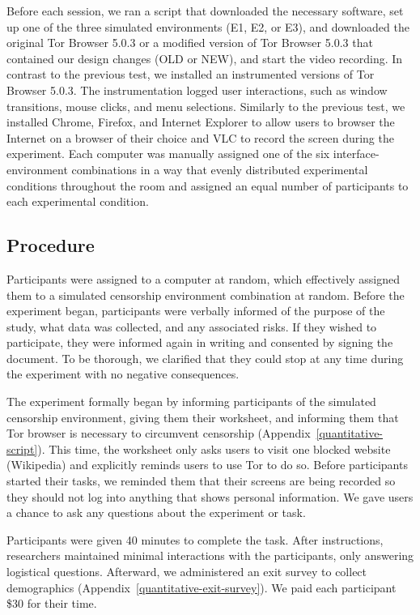 \documentclass[USenglish,oneside,twocolumn]{article}
\begin{document}
Before each session, we ran a script that downloaded the necessary software, set up one of the three simulated environments (E1, E2, or E3), and downloaded the original Tor Browser 5.0.3 or a modified version of Tor Browser 5.0.3 that contained our design changes (OLD or NEW), and start the video recording. In contrast to the previous test, we installed an instrumented versions of Tor Browser 5.0.3. The instrumentation logged user interactions, such as window transitions, mouse clicks, and menu selections. Similarly to the previous test, we installed Chrome, Firefox, and Internet Explorer to allow users to browser the Internet on a browser of their choice and VLC to record the screen during the experiment. Each computer was manually assigned one of the six interface-environment combinations in a way that evenly distributed experimental conditions throughout the room and assigned an equal number of participants to each experimental condition.

\subsection{Procedure}
Participants were assigned to a computer at random, which effectively assigned them to a simulated censorship environment combination at random. Before the experiment began, participants were verbally informed of the purpose of the study, what data was collected, and any associated risks. If they wished to participate, they were informed again in writing and consented by signing the document. To be thorough, we clarified that they could stop at any time during the experiment with no negative consequences. 

The experiment formally began by informing participants of the simulated censorship environment, giving them their worksheet, and informing them that Tor browser is necessary to circumvent censorship (Appendix~\ref{quantitative-script}). This time, the worksheet only asks users to visit one blocked website (Wikipedia) and explicitly reminds users to use Tor to do so. Before participants started their tasks, we reminded them that their screens are being recorded so they should not log into anything that shows personal information. We gave users a chance to ask any questions about the experiment or task. 

Participants were given 40 minutes to complete the task. After instructions, researchers maintained minimal interactions with the participants, only answering logistical questions. Afterward, we administered an exit survey to collect demographics (Appendix~\ref{quantitative-exit-survey}). We paid each participant \$30 for their time. 
\end{document}
